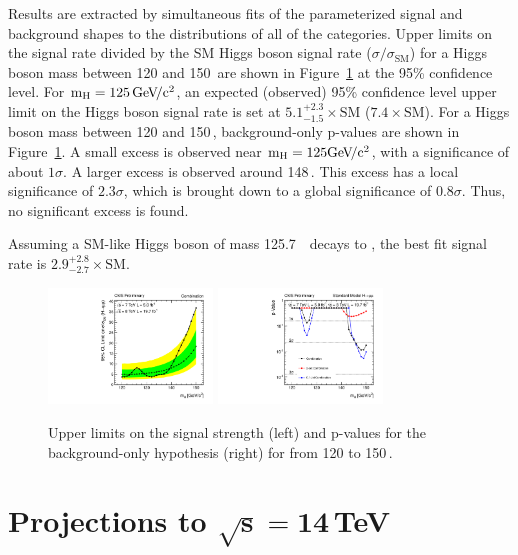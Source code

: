 \documentclass[10pt]{article}
\begin{document}
Results are extracted by simultaneous fits of the parameterized signal and background shapes
to the \Mmumu{} distributions of all of the categories.  Upper limits
on the signal rate divided by the SM Higgs boson signal rate ($\sigma/\sigma_\mathrm{SM}$) 
for a Higgs boson mass between 120 and 150\,\GeVcc{} are shown in Figure~\ref{fig:results} at 
the 95\% confidence level.  
For $\mathrm{m_H}{}=125\,\mathrm{Ge\kern -0.1em V\!/c^2}{}$, an expected (observed) 95\% confidence level upper limit
on the Higgs boson signal rate is set at 
$5.1^{+2.3}_{-1.5}\times\mathrm{SM}$ ($7.4\times\mathrm{SM}$).
For a Higgs boson mass between 120 and 150\,\GeVcc{}, background-only p-values are shown
in Figure~\ref{fig:results}.  A small excess is observed near $\mathrm{m_H}{}=125\mathrm{Ge\kern -0.1em V\!/c^2}{}$, with
a significance of about $1\sigma$.  A larger excess is observed around 148\,\GeVcc{}.
This excess has a local significance of $2.3\sigma$, which is brought down to a global significance
of $0.8\sigma$.  Thus, no significant excess is found.

Assuming a SM-like Higgs boson of mass 125.7\,\GeVcc{}~\cite{CMS:yva} decays to \mm{},
the best fit signal rate is $2.9^{+2.8}_{-2.7}\times\mathrm{SM}$.

\begin{figure}[htb]
\centering
\includegraphics[width=0.39\textwidth]{plotsPublic/limits_annalysisA/pdf/CombSplitAll_7P8TeV.pdf}
\includegraphics[width=0.39\textwidth]{plotsPublic/pValues_analysisA/pdf/pValues_Final7P8TeV.pdf}
\caption{ Upper limits on the signal strength (left) and p-values for the 
            background-only hypothesis (right) for \mh{} from 120 to 150\,\GeVcc{}.}
\label{fig:results}
\end{figure}

\section{Projections to $\mathbf{\sqrt{s}=14}$\,TeV}
\end{document}
